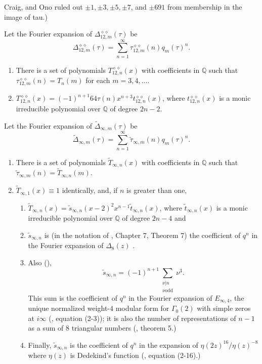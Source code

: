 \documentclass{article}
\begin{document}
Craig, and Ono 
\cite{balakrishnan2020variations}
ruled out
$\pm 1, \pm 3, \pm 5,
\pm 7$, and $\pm 691$ from 
membership in the image of tau.)
\begin{conjecture}
Let the Fourier expansion of 
$\Delta^{\diamond \diamond}_{12,m}(\tau)$ be
$$
\Delta^{\diamond \diamond}_{12,m} (\tau)= 
\sum_{n=1}^{\infty} 
\tau_{12,m}^{\diamond \diamond}(n) q_m(\tau)^n.
$$
\begin{enumerate}
\item There is a set of polynomials
$T^{\diamond \diamond}_{12,n}(x)$
with coefficients in $\mathbb{Q}$ such that 
$\tau_{12,m}^{\diamond \diamond}(n) = T_n(m)$
for each $m = 3, 4, ....$
\item $T^{\diamond \diamond}_{12,n}(x) = 
(-1)^{n+1}64 \tau(n) x^{n+3} t^{\diamond \diamond}_{12,n}(x)$,
where  $t^{\diamond \diamond}_{12,n}(x)$ 
is a monic irreducible polynomial
over $\mathbb{Q}$ of degree $2n - 2$.
\end{enumerate}
\end{conjecture}
\begin{conjecture}
Let the Fourier expansion of 
$\widetilde{\Delta}_{\infty,m}(\tau)$ be
$$
\widetilde{\Delta}_{\infty,m}(\tau) = 
\sum_{n=1}^{\infty} \tilde{\tau}_{\infty,m}(n) q_m(\tau)^n.
$$
\begin{enumerate}
\item There is a set of polynomials
$\widetilde{T}_{\infty,n}(x)$
with coefficients in $\mathbb{Q}$ such that 
$\tilde{\tau}_{\infty,m}(n) = \widetilde{T}_{\infty,n}(m)$.
\item
$\widetilde{T}_{\infty,1}(x) \equiv 1$ identically,
and, if $n$ is greater than one,  
\begin{enumerate}
\item $\widetilde{T}_{\infty,n}(x) = 
\tilde{s}_{\infty,n}(x-2)^2 x^{n-1} \tilde{t}_{\infty,n}(x)$,
where $\tilde{t}_{\infty,n}(x)$ is a
monic irreducible polynomial 
over $\mathbb{Q}$
of degree $2n - 4$ and
\item
$\tilde{s}_{\infty,n}$ is 
(in the notation of \cite{conway2013sphere},
 Chapter 7, Theorem 7) the
coefficient of $q^n$ in the Fourier
expansion of $\Delta_8(z)$ \cite{OEIS3}. 
\item Also (\cite{OEIS4}), 
$$
\tilde{s}_{\infty,n} = (-1)^{n+1} 
\sum_{\substack{\nu | n \\ \nu \text{odd}}} \nu^3.
$$
This sum is the coefficient of 
$q^n$ in the Fourier expansion
of $E_{\infty, 4}$,
the unique normalized weight-$4$ modular form 
for $\Gamma_0(2)$ with simple zeros at 
$i \infty$ (\cite{brent1998quadratic},
equation (2-3));
it is also the number of representations of 
$n-1$ as a sum of $8$ triangular numbers
(\cite{ono1995representation}, theorem 5.)
\item
Finally, $\tilde{s}_{\infty,n}$ is 
the coefficient of $q^n$ in the expansion 
of $\eta(2z)^{16}/\eta(z)^{-8}$
where $\eta(z)$ is Dedekind's function
(\cite{brent1998quadratic}, equation (2-16).)
\end{enumerate}
\end{enumerate}
\end{conjecture}
\end{document}
